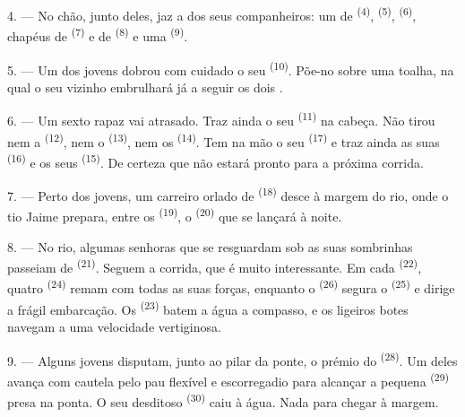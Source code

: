 4. --- No chão, junto deles, jaz a  dos seus companheiros:
um  de  \textsuperscript{(4)}, 
\textsuperscript{(5)},  \textsuperscript{(6)}, chapéus de
 \textsuperscript{(7)} e de  \textsuperscript{(8)} e uma
 \textsuperscript{(9)}.

5. --- Um dos jovens dobrou com cuidado o seu 
\textsuperscript{(10)}. Põe-no sobre uma toalha, na qual o seu vizinho
embrulhará já a seguir os dois .

6. --- Um sexto rapaz vai atrasado. Traz ainda o seu 
\textsuperscript{(11)} na cabeça. Não tirou nem a 
\textsuperscript{(12)}, nem o  \textsuperscript{(13)}, nem os
 \textsuperscript{(14)}. Tem na mão o seu 
\textsuperscript{(17)} e traz ainda as suas  \textsuperscript{(16)} e os
seus  \textsuperscript{(15)}. De certeza que não estará
pronto para a próxima corrida.

7. --- Perto dos jovens, um carreiro orlado de 
\textsuperscript{(18)} desce à margem do rio, onde o tio Jaime prepara, entre
os  \textsuperscript{(19)}, o 
\textsuperscript{(20)} que se lançará à noite.

\VUsaut{4.4mm}
\VUsaut{3.4mm}

8. --- No rio, algumas senhoras que se resguardam sob as suas
sombrinhas passeiam de  \textsuperscript{(21)}. Seguem a corrida,
que é muito interessante. Em cada  \textsuperscript{(22)}, quatro
 \textsuperscript{(24)} remam com todas as suas forças,
enquanto o  \textsuperscript{(26)} segura o 
\textsuperscript{(25)} e dirige a frágil embarcação. Os 
\textsuperscript{(23)} batem a água a compasso, e os ligeiros botes navegam a
uma velocidade vertiginosa.

9. --- Alguns jovens disputam, junto ao pilar da ponte, o prémio do
 \textsuperscript{(28)}. Um deles avança com
cautela pelo pau flexível e escorregadio para alcançar a pequena
 \textsuperscript{(29)} presa na ponta. O seu desditoso
 \textsuperscript{(30)} caiu à água. Nada para chegar à
margem.

